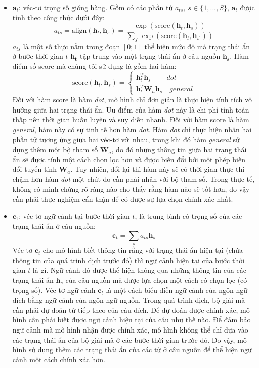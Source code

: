 \begin{itemize}
	\item $\bm{a}_t$: véc-tơ trọng số gióng hàng. Gồm có các phần tử $a_{ts},\ s \in \{1, ..., S\}$, $\bm{a}_t$ được tính theo công thức dưới đây:
	\begin{equation}
	a_{ts} = \text{align}(\bm{h}_t, \bm{h}_s) = \frac{\exp\left(\text{score}(\bm{h}_t, \bm{h}_s)\right)}{\sum_{s^{'}}\exp\left(\text{score}(\bm{h}_t, \bm{h}_{s^{'}})\right)}
	\end{equation}
	$a_{ts}$ là một số thực nằm trong đoạn $[0;1]$ thể hiện mức độ mà trạng thái ẩn ở bước thời gian $t$ $\bm{h_t}$ tập trung vào một trạng thái ẩn ở câu nguồn $\bm{h_s}$. Hàm điểm số score mà chúng tôi sử dụng là gồm hai hàm:
	\begin{equation}
	\text{score}(\bm{h}_t, \bm{h}_s) = \left\{
			\begin{array}{ll}
			\bm{h}^T_t \bm{h}_s \ \quad\quad dot\\
			\bm{h}^T_t \bm{W}_a \bm{h}_s	\quad general
			\end{array}
		\right.
	\end{equation}
	Đối với hàm score là hàm \textit{dot}, mô hình chỉ đơn giản là thực hiện tính tích vô hướng giữa hai trạng thái ẩn. Ưu điểm của hàm \textit{dot} này là chi phí tính toán thấp nên thời gian huấn luyện và suy diễn nhanh.
	Đối với hàm score là hàm \textit{general}, hàm này có sự tinh tế hơn hàm \textit{dot}. Hàm \textit{dot} chỉ thực hiện nhân hai phần tử tương ứng giữa hai véc-tơ với nhau, trong khi đó hàm \textit{general} sử dụng thêm một bộ tham số $\bm{W}_a$, do đó những thông tin giữa hai trạng thái ẩn sẽ được tính một cách chọn lọc hơn và được biến đổi bởi một phép biến đổi tuyến tính $\bm{W}_a$. Tuy nhiên, đổi lại thì hàm này sẽ có thời gian thực thi chậm hơn hàm \textit{dot} một chút do cần phải nhân với bộ tham số. Trong thực tế, không có minh chứng rõ ràng nào cho thấy rằng hàm nào sẽ tốt hơn, do vậy cần phải thực nghiệm cẩn thận để có được sự lựa chọn chính xác nhất.
	\item $\bm{c_t}$: véc-tơ ngữ cảnh tại bước thời gian $t$, là trung bình có trọng số của các trạng thái ẩn ở câu nguồn:
	\begin{equation}
	\bm{c}_t = \sum_{s}a_{ts}\bm{h}_s
	\end{equation}
	Véc-tơ $\bm{c}_t$ cho mô hình biết thông tin rằng với trạng thái ẩn hiện tại (chứa thông tin của quá trình dịch trước đó) thì ngữ cảnh hiện tại của bước thời gian $t$ là gì. Ngữ cảnh đó được thể hiện thông qua những thông tin của các trạng thái ẩn $\bm{h}_s$ của câu nguồn mà được lựa chọn một cách có chọn lọc (có trọng số). Véc-tơ ngữ cảnh $\bm{c}_t$ là một cách biểu diễn ngữ cảnh của ngôn ngữ đích bằng ngữ cảnh của ngôn ngữ nguồn. Trong quá trình dịch, bộ giải mã cần phải dự đoán từ tiếp theo của câu đích. Để dự đoán được chính xác, mô hình cần phải biết được ngữ cảnh hiện tại của câu như thế nào. Để đảm bảo ngữ cảnh mà mô hình nhận được chính xác, mô hình không thể chỉ dựa vào các trạng thái ẩn của bộ giải mã ở các bước thời gian trước đó. Do vậy, mô hình sử dụng thêm các trạng thái ẩn của các từ ở câu nguồn để thể hiện ngữ cảnh một cách chính xác hơn.

\end{itemize}
